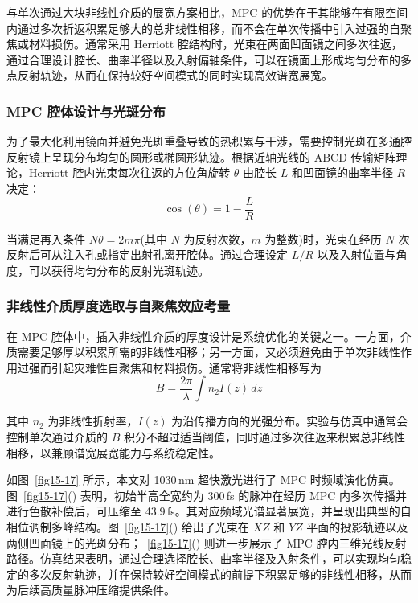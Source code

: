 与单次通过大块非线性介质的展宽方案相比，MPC 的优势在于其能够在有限空间内通过多次折返积累足够大的总非线性相移，而不会在单次传播中引入过强的自聚焦或材料损伤。通常采用 Herriott 腔结构时，光束在两面凹面镜之间多次往返，通过合理设计腔长、曲率半径以及入射偏轴条件，可以在镜面上形成均匀分布的多点反射轨迹，从而在保持较好空间模式的同时实现高效谱宽展宽。





\subsubsection{MPC 腔体设计与光斑分布}

为了最大化利用镜面并避免光斑重叠导致的热积累与干涉，需要控制光斑在多通腔反射镜上呈现分布均匀的圆形或椭圆形轨迹。根据近轴光线的 ABCD 传输矩阵理论，Herriott 腔内光束每次往返的方位角旋转 $\theta$ 由腔长 $L$ 和凹面镜的曲率半径 $R$ 决定：
\begin{equation}
    \cos(\theta) = 1 - \frac{L}{R}
\end{equation}

当满足再入条件 $N\theta = 2m\pi$(其中 $N$ 为反射次数，$m$ 为整数)时，光束在经历 $N$ 次反射后可从注入孔或指定出射孔离开腔体。通过合理设定 $L/R$ 以及入射位置与角度，可以获得均匀分布的反射光斑轨迹。




\subsubsection{非线性介质厚度选取与自聚焦效应考量}

在 MPC 腔体中，插入非线性介质的厚度设计是系统优化的关键之一。一方面，介质需要足够厚以积累所需的非线性相移；另一方面，又必须避免由于单次非线性作用过强而引起灾难性自聚焦和材料损伤。通常将非线性相移写为
\begin{equation}
    B = \frac{2\pi}{\lambda}\int n_2 I(z)\,dz
\end{equation}

其中 $n_2$ 为非线性折射率，$I(z)$ 为沿传播方向的光强分布。实验与仿真中通常会控制单次通过介质的 $B$ 积分不超过适当阈值，同时通过多次往返来积累总非线性相移，以兼顾谱宽展宽能力与系统稳定性。

如图~\ref{fig15-17} 所示，本文对 1030\,nm 超快激光进行了 MPC 时频域演化仿真。图~\ref{fig15-17}() 表明，初始半高全宽约为 300\,fs 的脉冲在经历 MPC 内多次传播并进行色散补偿后，可压缩至 43.9\,fs。其对应频域光谱显著展宽，并呈现出典型的自相位调制多峰结构。图~\ref{fig15-17}() 给出了光束在 $XZ$ 和 $YZ$ 平面的投影轨迹以及两侧凹面镜上的光斑分布；~\ref{fig15-17}() 则进一步展示了 MPC 腔内三维光线反射路径。仿真结果表明，通过合理选择腔长、曲率半径及入射条件，可以实现均匀稳定的多次反射轨迹，并在保持较好空间模式的前提下积累足够的非线性相移，从而为后续高质量脉冲压缩提供条件。

